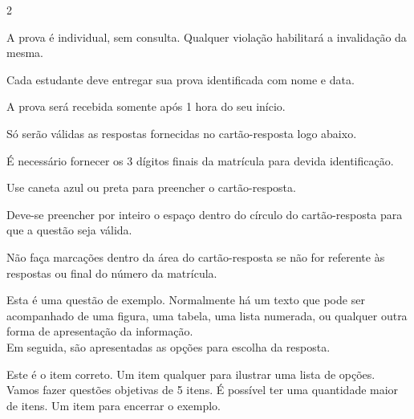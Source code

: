 \documentclass[11pt]{exam}
\begin{document}
\maketitle

\begin{multicols}{2}

\begin{orientacoes}
    \item A prova é individual, sem consulta. Qualquer violação habilitará a invalidação da mesma.
    \item Cada estudante deve entregar sua prova identificada com nome e data.
    \item A prova será recebida somente após 1 hora do seu início.
    \item Só serão válidas as respostas fornecidas no cartão-resposta logo abaixo.
    \item É necessário fornecer os 3 dígitos finais da matrícula para devida identificação.
    \item Use caneta azul ou preta para preencher o cartão-resposta.
    \item Deve-se preencher por inteiro o espaço dentro do círculo do cartão-resposta para que a questão seja válida.
    \item Não faça marcações dentro da área do cartão-resposta se não for referente às respostas ou final do número da matrícula.
\end{orientacoes}

\begin{questions}


\begin{question}[1]
Esta é uma questão de exemplo. Normalmente há um texto que pode ser acompanhado de uma figura, uma tabela, uma lista numerada, ou qualquer outra forma de apresentação da informação. \\
Em seguida, são apresentadas as opções para escolha da resposta.

\begin{choices}
    \CorrectChoice Este é o item correto.
    \choice Um item qualquer para ilustrar uma lista de opções.
    \choice Vamos fazer questões objetivas de 5 itens.
    \choice É possível ter uma quantidade maior de itens.
    \choice Um item para encerrar o exemplo.
\end{choices}
\end{question}



\end{questions}
\end{multicols}
\end{document}
